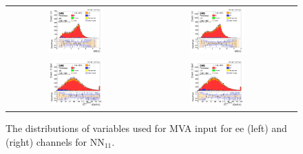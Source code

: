 \begin{figure}[ht]
  \begin{center}
    \begin{tabular}{ccc}
      \includegraphics[width=0.4\textwidth]{figures/tW/fig/MVA_input/ee/H_1j1b_dR_l1_l2.png}&
      \includegraphics[width=0.4\textwidth]{figures/tW/fig/MVA_input/mumu/H_1j1b_dR_l1_l2.png}\\
      \includegraphics[width=0.4\textwidth]{figures/tW/fig/MVA_input/ee/H_1j1b_ll_j1_pt.png}&
      \includegraphics[width=0.4\textwidth]{figures/tW/fig/MVA_input/mumu/H_1j1b_ll_j1_pt.png}\\
    \end{tabular}
    \caption{The distributions of variables used for MVA input for ee (left) and \mumu (right) channels for NN$_{11}$.
    \label{fig:MVA_1j1t_2}}
  \end{center}
\end{figure}





